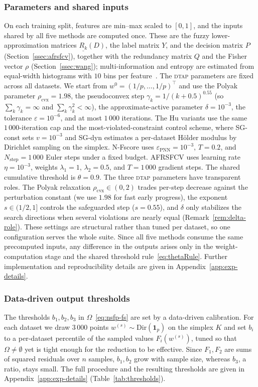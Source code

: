 \documentclass[]{interact}
\theoremstyle{plain}
\theoremstyle{definition}
\theoremstyle{remark}
\newcommand{\cvx}{\mathrm{cvx}}
\newcommand{\dtap}{\textsc{dtap}}
\begin{document}
\subsubsection{Parameters and shared inputs}\label{sssec:params}
On each training split, features are min--max scaled to $[0,1]$, and the inputs shared by all five methods are computed once. These are the fuzzy lower-approximation matrices $\underline{R_k}(D)$, the label matrix $Y$, and the decision matrix $P$ (Section~\ref{ssec:afrsfcv}), together with the redundancy matrix $Q$ and the Fisher vector $\rho$ (Section~\ref{ssec:wang}); multi-information and entropy are estimated from equal-width histograms with $10$ bins per feature~\citep{brown2012}. The \dtap{} parameters are fixed across all datasets. We start from $w^0=(1/p,\dots,1/p)^{\top}$ and use the Polyak parameter $\rho_{\cvx}=1.98$, the pseudoconvex step $\gamma_k=1/(k+0.5)^{0.55}$ (so $\sum_k\gamma_k=\infty$ and $\sum_k\gamma_k^2<\infty$), the approximate-active parameter $\delta=10^{-3}$, the tolerance $\varepsilon=10^{-6}$, and at most $1\,000$ iterations. The Hu variants use the same $1\,000$-iteration cap and the most-violated-constraint control scheme, where SG-const sets $v=10^{-3}$ and SG-dyn estimates a per-dataset H\"older modulus by Dirichlet sampling on the simplex. N-Fscore uses $\varepsilon_{\mathrm{PNN}}=10^{-3}$, $T=0.2$, and $N_{\mathrm{step}}=1\,000$ Euler steps under a fixed budget. AFRSFCV uses learning rate $\eta=10^{-3}$, weights $\lambda_1=1$, $\lambda_2=0.5$, and $T=1\,000$ gradient steps. The shared cumulative threshold is $\theta=0.9$. The three \dtap{} parameters have transparent roles. The Polyak relaxation $\rho_{\cvx}\in(0,2)$ trades per-step decrease against the perturbation constant (we use $1.98$ for fast early progress), the exponent $s\in(1/2,1]$ controls the safeguarded step ($s=0.55$), and $\delta$ only stabilizes the search directions when several violations are nearly equal (Remark~\ref{rem:delta-role}). These settings are structural rather than tuned per dataset, so one configuration serves the whole suite. Since all five methods consume the same precomputed inputs, any difference in the outputs arises only in the weight-computation stage and the shared threshold rule~\eqref{eq:thetaRule}. Further implementation and reproducibility details are given in Appendix~\ref{app:exp-details}.

\subsubsection{Data-driven output thresholds}\label{sssec:thresholds}
The thresholds $b_1,b_2,b_3$ in $\Omega$~\eqref{eq:nsfp-fs} are set by a data-driven calibration. For each dataset we draw $3\,000$ points $w^{(s)}\sim\mathrm{Dir}(\mathbf{1}_p)$ on the simplex $K$ and set $b_i$ to a per-dataset percentile of the sampled values $F_i(w^{(s)})$, tuned so that $\Omega\ne\emptyset$ yet is tight enough for the reduction to be effective. Since $F_1,F_2$ are sums of squared residuals over $n$ samples, $b_1,b_2$ grow with sample size, whereas $b_3$, a ratio, stays small. The full procedure and the resulting thresholds are given in Appendix~\ref{app:exp-details} (Table~\ref{tab:thresholds}).
\end{document}
